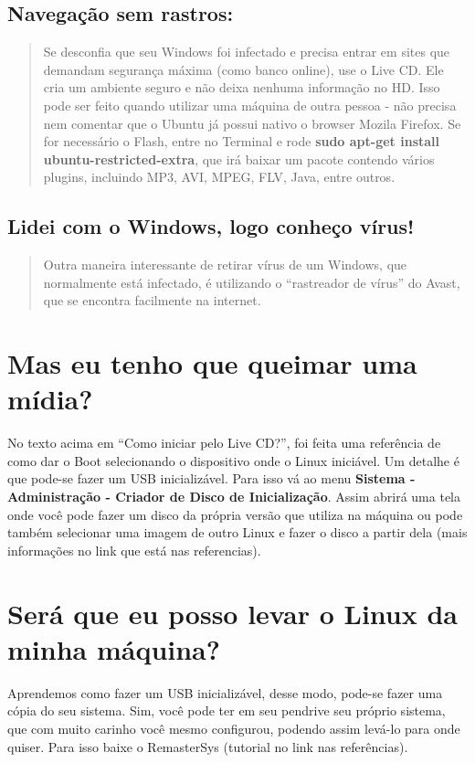 \documentclass[12pt, a4paper, tocpage=plain]{abnt} %
\begin{document}
\section{Navegação sem rastros:}

\begin{quote}
Se desconfia que seu Windows foi infectado e precisa entrar em sites que demandam segurança máxima (como banco online), use o Live CD. Ele cria um ambiente seguro e não deixa nenhuma informação no HD. Isso pode ser feito quando utilizar uma máquina de outra pessoa - não precisa nem comentar que o Ubuntu já possui nativo o browser Mozila Firefox. Se for necessário o Flash, entre no Terminal e rode {\bf sudo apt-get install ubuntu-restricted-extra}, que irá baixar um pacote contendo vários plugins, incluindo MP3, AVI, MPEG, FLV, Java, entre outros.
\end{quote}

\section{Lidei com o Windows, logo conheço vírus!}

\begin{quote}
Outra maneira interessante de retirar vírus de um Windows, que normalmente está infectado, é utilizando o “rastreador de vírus” do Avast, que se encontra facilmente na internet.
\end{quote}

\chapter{Mas eu tenho que queimar uma mídia?}

No texto acima em “Como iniciar pelo Live CD?”, foi feita uma referência de como dar o Boot selecionando o dispositivo onde o Linux iniciável. Um detalhe é que pode-se fazer um USB inicializável. Para isso vá ao menu {\bf Sistema - Administração - Criador de Disco de Inicialização}. Assim abrirá uma tela onde você pode fazer um disco da própria versão que utiliza na máquina ou pode também selecionar uma imagem de outro Linux e fazer o disco a partir dela (mais informações no link que está nas referencias).

\chapter{Será que eu posso levar o Linux da minha máquina?}

Aprendemos como fazer um USB inicializável, desse modo, pode-se fazer uma cópia do seu sistema. Sim, você pode ter em seu pendrive seu próprio sistema, que com muito carinho você mesmo configurou, podendo assim levá-lo para onde quiser. Para isso baixe o RemasterSys (tutorial no link nas referências).
\end{document}
